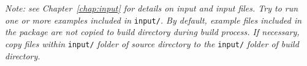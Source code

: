{\emph{Note: see Chapter~\ref{chap:input} for details on input and input files. Try to run one or more examples included in}} \texttt{input/}{\emph{. By default, example files included in the package are not copied to build directory during build process. If necessary, copy files within}} \texttt{input/} {\emph{folder of source directory to the}} \texttt{input/} {\emph{folder of build directory.}}

